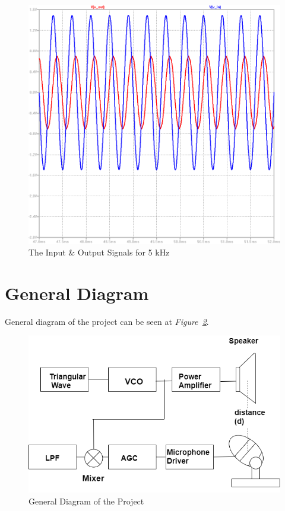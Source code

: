 \documentclass[paper]{IEEEtran}
\begin{document}
\begin{figure}[h!]
	\setlength{\unitlength}{\textwidth}
	\center 
	\includegraphics[width=0.45\unitlength]{lpf_op4.png}
	\caption{\label{fig:lpfvo2}The Input \& Output Signals for 5 kHz}
\end{figure} 

		
\section{General Diagram}

	General diagram of the project can be seen at \textit{Figure~\ref{fig:diagram}}.

\begin{figure}[h!]
\setlength{\unitlength}{\textwidth}
\center 
\includegraphics[width=0.5\unitlength]{diagram3.png}
\caption{\label{fig:diagram}General Diagram of the Project }
\end{figure}	
\end{document}
